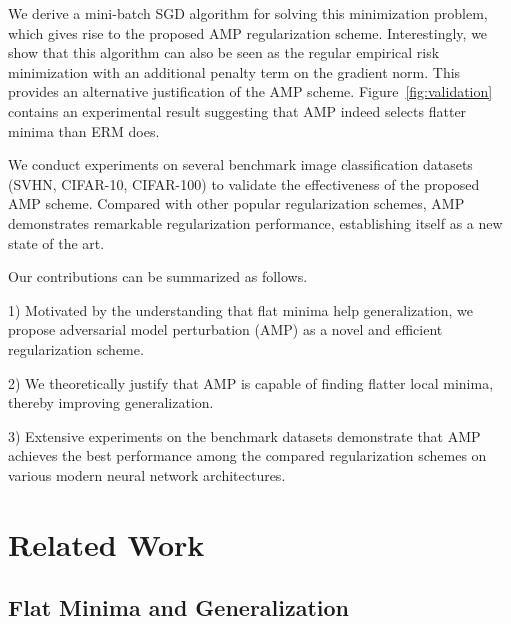 \documentclass[final]{cvpr}
\begin{document}
We derive a mini-batch SGD algorithm for solving this minimization problem, which gives rise to the proposed AMP regularization scheme. Interestingly, we show that this algorithm can also be seen as the regular empirical risk minimization with an additional penalty term on the gradient norm. This provides an alternative justification of the AMP scheme. Figure~\ref{fig:validation} contains an experimental result suggesting that AMP indeed selects flatter minima than ERM does. 

We conduct experiments on several benchmark image classification datasets (SVHN, CIFAR-10, CIFAR-100) to validate the effectiveness of the proposed AMP scheme. Compared with other popular regularization schemes, AMP demonstrates remarkable regularization performance, establishing itself as a new state of the art. 

Our contributions can be summarized as follows.

1) Motivated by the understanding that flat minima help generalization, we propose adversarial model perturbation (AMP) as a novel and efficient regularization scheme.

2) We theoretically justify that AMP is capable of finding flatter local minima, thereby improving generalization.

3) Extensive experiments on the benchmark datasets demonstrate that AMP achieves the best performance among the compared regularization schemes on various modern neural network architectures.

\section{Related Work}

\subsection{Flat Minima and Generalization}
\end{document}
